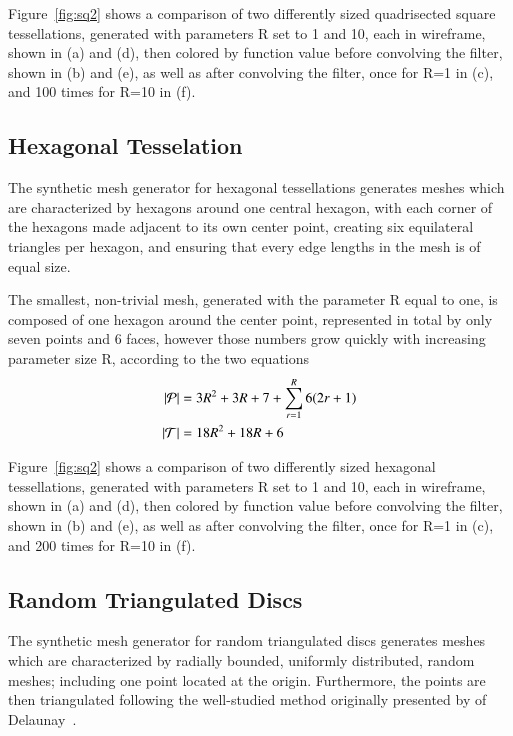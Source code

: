 Figure~\ref{fig:sq2} shows a comparison of two differently sized quadrisected square tessellations, generated with parameters R set to 1 and 10, each in wireframe, shown in (a) and (d), then colored by function value before convolving the filter, shown in (b) and (e), as well as after convolving the filter, once for R=1 in (c), and 100 times for R=10 in (f).


%
%
%
%
\pagebreak
\subsection{Hexagonal Tesselation}
The synthetic mesh generator for hexagonal tessellations generates meshes which are characterized by hexagons around one central hexagon, with each corner of the hexagons made adjacent to its own center point, creating six equilateral triangles per hexagon, and ensuring that every edge lengths in the mesh is of equal size.

The smallest, non-trivial mesh, generated with the parameter R equal to one, is composed of one hexagon around the center point, represented in total by only seven points and 6 faces, however those numbers grow quickly with increasing parameter size R, according to the two equations
\begin{align}
	|\mathcal{P}| &= 3R^2 + 3R + 7 +\sum_{r=1}^R{6(2r + 1)}\\
	|\mathcal{T}| &= 18R^2 + 18R + 6
	\label{eq:hexPointAndFaceCounts}
\end{align}

Figure~\ref{fig:sq2} shows a comparison of two differently sized hexagonal tessellations, generated with parameters R set to 1 and 10, each in wireframe, shown in (a) and (d), then colored by function value before convolving the filter, shown in (b) and (e), as well as after convolving the filter, once for R=1 in (c), and 200 times for R=10 in (f).



%
%
%
%
\pagebreak
\subsection{Random Triangulated Discs}
The synthetic mesh generator for random triangulated discs generates meshes which are characterized by radially bounded, uniformly distributed, random meshes; including one point located at the origin. Furthermore, the points are then triangulated following the well-studied method originally presented by of Delaunay~\cite{Delaunay34}.

